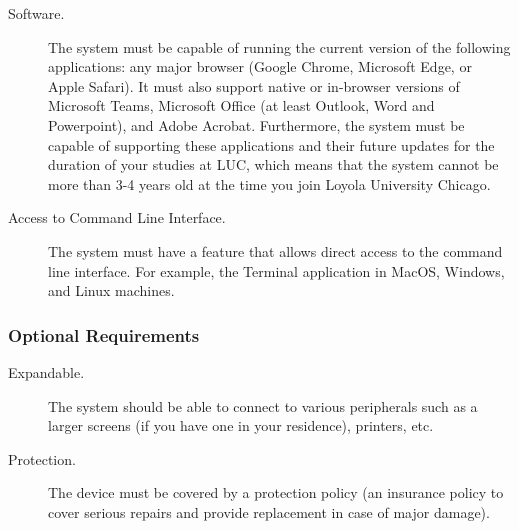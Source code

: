 \begin{description}
    \item[Software.] The system must be capable of running the current version of the following applications: any major browser (Google Chrome, Microsoft Edge, or Apple Safari). It must also support native or in-browser versions of Microsoft Teams, Microsoft Office (at least Outlook, Word and Powerpoint), and Adobe Acrobat. Furthermore, the system must be capable of supporting these applications and their future updates for the duration of your studies at LUC, which means that the system cannot be more than 3-4 years old at the time you join Loyola University Chicago.

    \item[Access to Command Line Interface.] The system must have a feature that allows direct access to the command line interface. For example, the Terminal application in MacOS, Windows, and Linux machines. 
    
\end{description}

\subsubsection*{Optional Requirements}

\begin{description}
    \item[Expandable.] The system should be able to connect to various peripherals such as a larger screens (if you have one in your residence), printers, etc. 
    
    \item[Protection.] The device must be covered by a protection policy (an insurance policy to cover serious repairs and provide replacement in case of major damage).

\end{description}